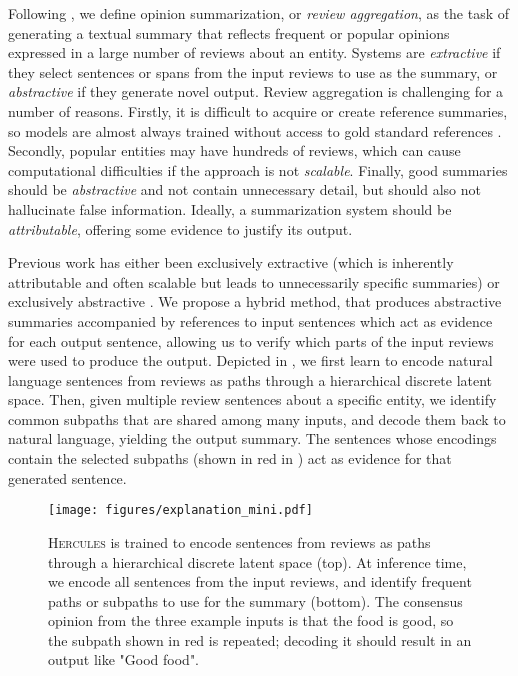 \documentclass[11pt]{article}
\begin{document}
Following \citet{ganesan-etal-2010-opinosis}, we define opinion summarization, or \textit{review aggregation}, as the task of generating a textual summary that reflects frequent or popular opinions expressed in a large number of reviews about an entity. Systems are \textit{extractive} if they select sentences or spans from the input reviews to use as the summary, or \textit{abstractive} if they generate novel output. Review aggregation is challenging for a number of reasons. Firstly, it is difficult to acquire or create reference summaries, so models are almost always trained without access to gold standard references \cite[][\textit{inter alia}.]{angelidis-etal-2021-extractive,amplayo2021unsupervised}. Secondly, popular entities may have hundreds of reviews, which can cause computational difficulties if the approach is not \textit{scalable}. Finally, good summaries should be \textit{abstractive} and not contain unnecessary detail, but should also not hallucinate false information. Ideally, a summarization system should be \textit{attributable}, offering some evidence to justify its output. 


Previous work has either been exclusively extractive (which is inherently attributable and often scalable but leads to unnecessarily specific summaries) or exclusively abstractive \cite[which often scales poorly and hallucinates, e.g.,][]{brazinskas-etal-2020-unsupervised} . We propose a hybrid method, that produces abstractive summaries accompanied by references to input sentences which act as evidence for each output sentence, allowing us to verify which parts of the input reviews were used to produce the output. Depicted in , we first learn to encode natural language sentences from reviews as paths through a hierarchical discrete latent space. Then, given multiple review sentences about a specific entity, we identify common subpaths that are shared among many inputs, and decode them back to natural language, yielding the output summary. The sentences whose encodings contain the selected subpaths (shown in red in ) act as evidence for that generated sentence. 


\begin{figure}[t!]
    \centering
    \texttt{[image: figures/explanation\_mini.pdf]}  
    \vspace{-0.2cm}
    \caption{\textsc{Hercules} is trained to encode sentences from reviews as paths through a hierarchical discrete latent space (top). At inference time, we encode all sentences from the input reviews, and identify frequent paths or subpaths to use for the summary (bottom). The consensus opinion from the three example inputs is that the food is good, so the subpath shown in red is repeated; decoding it should result in an output like "Good food". }
    \vspace{-0.2cm}
    \label{fig:idealised}
    \vspace{-0cm}
\end{figure}
\end{document}

